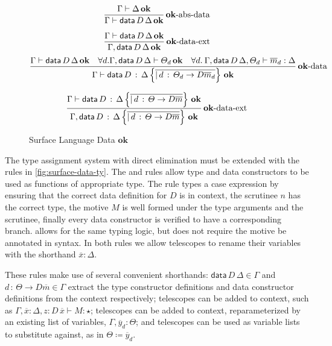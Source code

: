 \begin{figure}
\[
\frac{\Gamma\vdash\Delta\,\mathbf{ok}}{\Gamma\vdash\mathsf{data}\,D\,\Delta\,\mathbf{ok}}\operatorname{\mathbf{ok}-abs-data}
\]

\[
\frac{\Gamma\vdash\mathsf{data}\,D\,\Delta\,\mathbf{ok}}{\Gamma,\mathsf{data}\,D\,\Delta\,\mathbf{ok}}\operatorname{\mathbf{ok}-data-ext}
\]
\[
\frac{\Gamma\vdash\mathsf{data}\,D\,\Delta\,\mathbf{ok}\quad\forall d.\Gamma,\mathsf{data}\,D\,\Delta\vdash\varTheta_{d}\,\mathbf{ok}\quad\forall d.\:\Gamma,\mathsf{data}\,D\,\Delta,\varTheta_{d}\vdash\overline{m}_{d}:\Delta}{\Gamma\vdash\mathsf{data}\,D\,:\,\Delta\left\{ \overline{|\,d\,:\,\varTheta_{d}\rightarrow D\overline{m}_{d}}\right\} \,\mathbf{ok}}\operatorname{\mathbf{ok}-data}
\]

\[
\frac{\Gamma\vdash\mathsf{data}\,D\,:\,\Delta\left\{ \overline{|\,d\,:\,\varTheta\rightarrow D\overline{m}}\right\} \,\mathbf{ok}}{\Gamma,\mathsf{data}\,D\,:\,\Delta\left\{ \overline{|\,d\,:\,\varTheta\rightarrow D\overline{m}}\right\} \,\mathbf{ok}}\operatorname{\mathbf{ok}-data-ext}
\]

\caption{Surface Language Data $\mathbf{ok}$}
\label{fig:surface-data-ok}
\end{figure}

The type assignment system with direct elimination must be extended with the rules in \ref{fig:surface-data-ty}.
The  and  rules allow type and data constructors to be used as functions of appropriate type.
The  rule types a case expression by ensuring that the correct data definition for $D$ is in context, the scrutinee $n$ has the correct type, the motive $M$ is well formed under the type arguments and the scrutinee, %
  finally every data constructor is verified to have a corresponding branch.
 allows for the same typing logic, but does not require the motive be annotated in syntax.
In both rules we allow telescopes to rename their variables with the shorthand $\overline{x}:\Delta$.

These rules make use of several convenient shorthands:
  $\mathsf{data}\,D\,\Delta\in\Gamma$ and $d\,:\,\varTheta\rightarrow D\overline{m}\in\Gamma$ extract the type constructor definitions and data constructor definitions from the context respectively;
  telescopes can be added to context, such as $\Gamma,\overline{x}:\Delta,z:D\,\overline{x}\vdash M:\star$;
  telescopes can be added to context, reparameterized by an existing list of variables, $\Gamma,\overline{y}_{d}:\varTheta$;
  and telescopes can be used as variable lists to substitute against, as in $\varTheta\coloneqq\overline{y}_{d}$.

